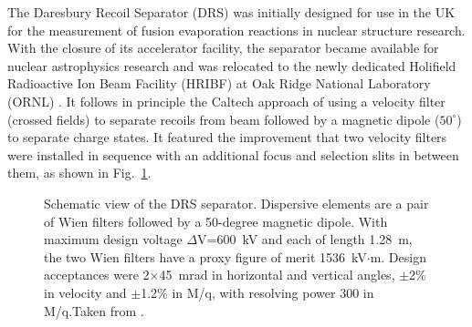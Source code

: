 The Daresbury Recoil Separator (DRS) was initially designed for use in the UK for the measurement of fusion evaporation reactions in nuclear structure research. With the closure of its accelerator facility, the separator became available for nuclear astrophysics research and was relocated to the newly dedicated Holifield Radioactive Ion Beam Facility (HRIBF) at Oak Ridge National Laboratory (ORNL) \cite{smit98}. It follows in principle the Caltech approach of using a velocity filter (crossed fields) to separate recoils from beam followed by a magnetic dipole ($50^\circ$) to separate charge states. It featured the improvement that two velocity filters were installed in sequence with an additional focus and selection slits in between them, as shown in Fig.\ \ref{fig:drs}.
\begin{figure}
\begin{center}
\caption{Schematic view of the DRS separator. Dispersive elements are a pair of Wien filters followed by a 50-degree magnetic dipole.   With maximum design voltage $\Delta$V=600~kV and each of length 1.28~m, the two Wien filters have a proxy figure of merit 1536~kV$\cdot$m.
Design acceptances were 2$\times$45~mrad in horizontal and vertical angles, $\pm$2\% in velocity and  $\pm$1.2\% in M/q, with resolving power 300 in M/q.Taken from \cite{bard09}.}
\label{fig:drs}
\end{center}
\end{figure}

